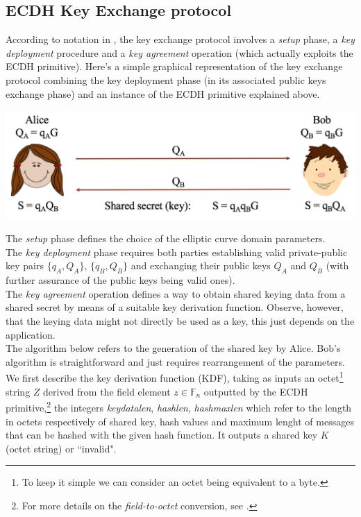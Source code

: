 \subsection{ECDH Key Exchange protocol}
According to notation in \cite{Sec}, the key exchange protocol involves a \textit{setup} phase, a \textit{key deployment} procedure and a \textit{key agreement} operation (which actually exploits the ECDH primitive).
Here's a simple graphical representation of the key exchange protocol combining the key deployment phase (in its associated public keys exchange phase) and an instance of the ECDH primitive explained above.
\begin{center}
	\includegraphics[scale = 0.55]{Images/ECDH.png}
	\label{fig:ECDH}
\end{center}
The \textit{setup} phase defines the choice of the elliptic curve domain parameters.\\
The \textit{key deployment} phase requires both parties establishing valid private-public key pairs $\{q_A,Q_A\}$, $\{q_B,Q_B\}$ and exchanging their public keys $Q_A$ and $Q_B$ (with further assurance of the public keys being valid ones).\\
The \textit{key agreement} operation defines a way to obtain shared keying data from a shared secret by means of a suitable key derivation function. Observe, however, that the keying data might not directly be used as a key, this just depends on the application.\\ The algorithm below refers to the generation of the shared key by Alice. Bob's algorithm is straightforward and just requires rearrangement of the parameters. We first describe the key derivation function (KDF), taking as inputs an octet\footnote{To keep it simple we can consider an octet being equivalent to a byte.} string $Z$ derived from the field element $z \in \mathbb{F}_n$ outputted by the ECDH primitive,\footnote{For more details on the \textit{field-to-octet} conversion, see \cite{Sec}.}
the integers \textit{keydatalen}, \textit{hashlen}, \textit{hashmaxlen} which refer to the length in octets respectively of shared key, hash values and maximum lenght of messages that can be hashed with the given hash function. It outputs a shared key $K$ (octet string) or ``invalid". 
